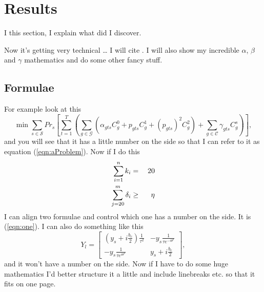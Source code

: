 \documentclass[
  11pt,
  twoside,
  11pt]{article}
\numberwithin{Theorem}{section}
\numberwithin{Definition}{section}
\numberwithin{Lemma}{section}
\numberwithin{Algorithm}{section}
\numberwithin{equation}{section}
\begin{document}
\section{Results}
\label{sec:results}
I this section, I explain what did I discover.

Now it's getting very technical \ldots{} I will cite \cite{shiina,groewe2001}. I will also show my incredible $\alpha$, $\beta$ and $\gamma$ mathematics and do some other fancy stuff.

\subsection{Formulae}

For example look at this
\begin{equation}\label{eqn:aProblem}
\min{}\sum_{s\in\mathcal{S}}Pr_{s}\left[\sum_{t=1}^{T}\left(
\sum_{g\in\mathcal{G}}\left(\alpha_{gts}C_{g}^{0}+
p_{gts}C_{g}^{1}+\left(p_{gts}\right)^{2}C_{g}^{2}\right)
+\sum_{g\in\mathcal{C}}\gamma_{gts}C_{g}^{s}\right)\right],
\end{equation}
and you will see that it has a little number on the side so that I can refer to it as equation (\ref{eqn:aProblem}). Now if I do this
\begin{eqnarray}
\sum_{i=1}^{n}k_{i}&=&20\label{eqn:one}\\
\sum_{j=20}^{m}\delta_{i}&\geq{}&\eta{}\notag
\end{eqnarray}
I can align two formulae and control which one has a number on the side. It is (\ref{eqn:one}). I can also do something like this
\begin{displaymath}
Y_{l}=\left[\begin{array}{cc}
             \left(y_{s}+i\frac{b_{c}}{2}\right)\frac{1}{\tau{}^{2}} &
             -y_{s}\frac{1}{\tau{}e^{-i\theta^{s}}}\\
             -y_{s}\frac{1}{\tau{}e^{i\theta^{s}}} &
             y_{s}+i\frac{b_{c}}{2}
             \end{array}\right],
\end{displaymath}
and it won't have a number on the side. Now if I have to do some huge mathematics I'd better structure it a little and include linebreaks etc. so that it fits on one page.
\end{document}

